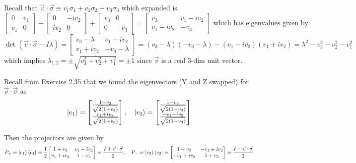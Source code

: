 \documentclass[12pt]{exam}
\begin{document}
\begin{solution}
    Recall that $\vec{v}\cdot \vec{\sigma}\equiv v_1\sigma_1 + v_2\sigma_2 + v_3\sigma_3$ which expanded is 
    $$\begin{bmatrix} 0 & v_1 \\ v_1 & 0 \end{bmatrix}
        + \begin{bmatrix} 0 & -iv_2 \\ iv_2 & 0 \end{bmatrix}
        + \begin{bmatrix} v_3 & 0 \\ 0 & -v_3 \end{bmatrix}
        =  \begin{bmatrix} v_3 & v_1-iv_2 \\ v_1+iv_2 & -v_3 \end{bmatrix} \text{ which has eigenvalues given by}
        $$ $$
        \det(\vec{v}\cdot \vec{\sigma}-I\lambda) = \begin{bmatrix} v_3-\lambda & v_1-iv_2 \\ v_1+iv_2 & -v_3-\lambda \end{bmatrix}
    =(v_3-\lambda)(-v_3-\lambda)-(v_1-iv_2)(v_1+iv_2)=\lambda^2-v_3^2-v_2^2-v_1^2$$
    which implies $\lambda_{1,2}=\pm\sqrt{v_3^2+v_2^2+v_1^2}=\pm 1$ since $\vec{v}$ is a real 3-dim unit vector. 

    Recall from Exercise 2.35 that we found the eigenvectors (Y and Z swapped) for $\vec{v}\cdot \vec{\sigma}$ as 
    $$\ket{e_1}=\begin{bmatrix}
        \frac{1 + v_3}{\sqrt{2(1+v_3)}} \\ \frac{v_1 + iv_2}{\sqrt{2(1+v_3)}}
    \end{bmatrix}, 
    \quad  
    \ket{e_2}=\begin{bmatrix}
        \frac{1 - v_3}{\sqrt{2(1-v_3)}} \\ \frac{-v_1 - iv_2}{\sqrt{2(1-v_3)}}
    \end{bmatrix}$$
    
    Then the projectors are given by 
    $$P_+= \ket{e_1}\bra{e_1}=\frac{1}{2}\begin{bmatrix}
        1+v_3 & v_1-iv_2 \\ v_1+iv_2   & 1-v_3
    \end{bmatrix} = \frac{I +\vec{v}\cdot \vec{\sigma}}{2};
    \quad  P_-=\ket{e_2}\bra{e_2}=\begin{bmatrix}
        1-v_3 & -v_1+iv_2 \\ -v_1+iv_2   & 1+v_3
    \end{bmatrix} = \frac{I -\vec{v}\cdot \vec{\sigma}}{2}$$
\end{solution}
\end{document}
